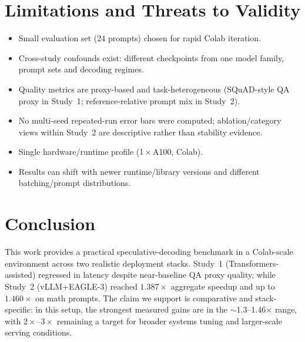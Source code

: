 \documentclass[11pt]{article}
\begin{document}
\section{Limitations and Threats to Validity}
\begin{itemize}[leftmargin=1.2em]
    \item Small evaluation set (24 prompts) chosen for rapid Colab iteration.
    \item Cross-study confounds exist: different checkpoints from one model family, prompt sets and decoding regimes.
    \item Quality metrics are proxy-based and task-heterogeneous (SQuAD-style QA proxy in Study~1; reference-relative prompt mix in Study~2).
    \item No multi-seed repeated-run error bars were computed; ablation/category views within Study~2 are descriptive rather than stability evidence.
    \item Single hardware/runtime profile (1\,$\times$\,A100, Colab).
    \item Results can shift with newer runtime/library versions and different batching/prompt distributions.
\end{itemize}

\section{Conclusion}
This work provides a practical speculative-decoding benchmark in a Colab-scale environment across two realistic deployment stacks. Study~1 (Transformers-assisted) regressed in latency despite near-baseline QA proxy quality, while Study~2 (vLLM+EAGLE-3) reached $1.387\times$ aggregate speedup and up to $1.460\times$ on math prompts. The claim we support is comparative and stack-specific: in this setup, the strongest measured gains are in the $\sim$1.3--1.46$\times$ range, with $2\times$--$3\times$ remaining a target for broader systems tuning and larger-scale serving conditions.



\end{document}

